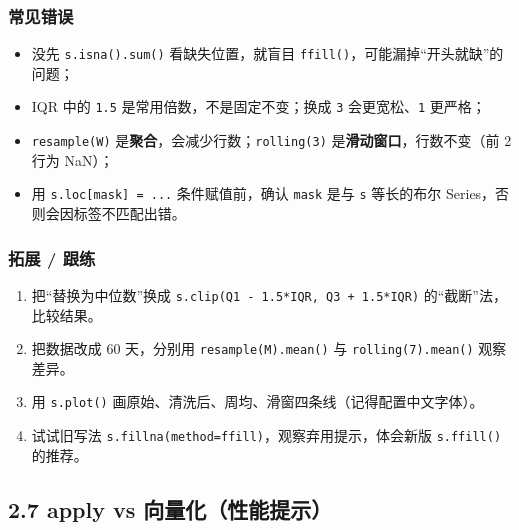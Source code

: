 \subsubsection{常见错误}\label{ux5e38ux89c1ux9519ux8bef-19}

\begin{itemize}
\tightlist
\item
  没先 \texttt{s.isna().sum()} 看缺失位置，就盲目
  \texttt{ffill()}，可能漏掉``开头就缺''的问题；
\item
  IQR 中的 \texttt{1.5} 是常用倍数，不是固定不变；换成 \texttt{3}
  会更宽松、\texttt{1} 更严格；
\item
  \texttt{resample(\textquotesingle{}W\textquotesingle{})}
  是\textbf{聚合}，会减少行数；\texttt{rolling(3)}
  是\textbf{滑动窗口}，行数不变（前 2 行为 NaN）；
\item
  用 \texttt{s.loc{[}mask{]}\ =\ ...} 条件赋值前，确认 \texttt{mask}
  是与 \texttt{s} 等长的布尔 Series，否则会因标签不匹配出错。
\end{itemize}

\subsubsection{拓展 / 跟练}\label{ux62d3ux5c55-ux8ddfux7ec3-8}

\begin{enumerate}
\def\labelenumi{\arabic{enumi}.}
\tightlist
\item
  把``替换为中位数''换成
  \texttt{s.clip(Q1\ -\ 1.5*IQR,\ Q3\ +\ 1.5*IQR)}
  的``截断''法，比较结果。
\item
  把数据改成 60 天，分别用
  \texttt{resample(\textquotesingle{}M\textquotesingle{}).mean()} 与
  \texttt{rolling(7).mean()} 观察差异。
\item
  用 \texttt{s.plot()}
  画原始、清洗后、周均、滑窗四条线（记得配置中文字体）。
\item
  试试旧写法
  \texttt{s.fillna(method=\textquotesingle{}ffill\textquotesingle{})}，观察弃用提示，体会新版
  \texttt{s.ffill()} 的推荐。
\end{enumerate}

\subsection{2.7 apply vs
向量化（性能提示）}\label{apply-vs-ux5411ux91cfux5316ux6027ux80fdux63d0ux793a}

